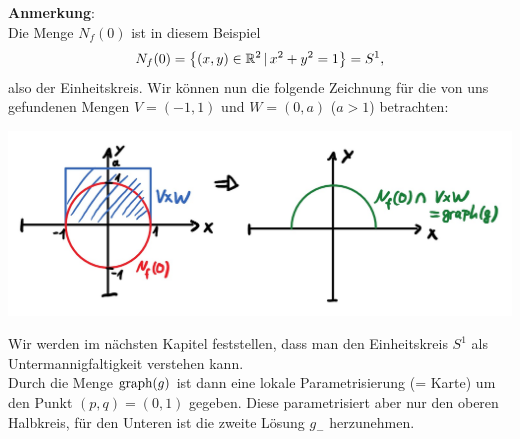 \begin{Beispiel}
    \textbf{Anmerkung}:\\
    Die Menge $N_f(0)$ ist in diesem Beispiel
    \begin{equation*}
        N_f(0)=\left\{(x,y)\in\mathbb{R}^2\,|\, x^2+y^2=1\right\}=S^1,
    \end{equation*}
    also der Einheitskreis. Wir können nun die folgende Zeichnung für die von uns gefundenen Mengen $V=(-1,1)$ und $W=(0,a)$ ($a>1$) betrachten:
    \begin{center}
        \includegraphics[width=.8\textwidth]{Dateien/09/09BeispielImpliziteFunktionen.jpg}
    \end{center}
    Wir werden im nächsten Kapitel feststellen, dass man den Einheitskreis $S^1$ als Untermannigfaltigkeit verstehen kann.\\
    Durch die Menge $\text{graph}(g)$ ist dann eine lokale Parametrisierung (= Karte) um den Punkt $(p,q)=(0,1)$ gegeben. Diese parametrisiert aber nur den oberen Halbkreis, für den Unteren ist die zweite Lösung $g_-$ herzunehmen.
\end{Beispiel}
